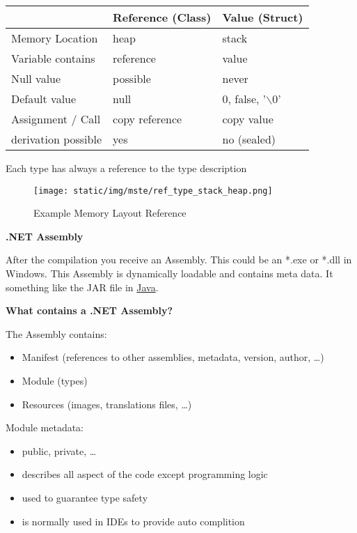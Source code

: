 \documentclass[11pt,twoside,landscape]{article}
\begin{document}
\begin{multicols}{3}
\begin{table}[htbp]
\label{tab:org7cf7613}
\centering
\begin{tabular}{lll}
 & Reference (Class) & Value (Struct)\\
\hline
Memory Location & heap & stack\\
Variable contains & reference & value\\
Null value & possible & never\\
Default value & null & 0, false, '$\backslash$0'\\
Assignment / Call & copy reference & copy value\\
derivation possible & yes & no (sealed)\\
\end{tabular}
\end{table}

Each type has always a reference to the type description 

\begin{figure}[htbp]
\centering
\texttt{[image: static/img/mste/ref\_type\_stack\_heap.png]}
\caption{\label{fig:orgfddb8f3}Example Memory Layout Reference}
\end{figure}

\textbf{.NET Assembly}

After the compilation you receive an Assembly.
This could be an *.exe or *.dll in Windows.
This Assembly is dynamically loadable and contains meta data.
It something like the JAR file in \href{../../../roam/20201116150053-java.org}{Java}.

\textbf{What contains a .NET Assembly?}

The Assembly contains:
\begin{itemize}
\item Manifest (references to other assemblies, metadata, version, author, \ldots{})
\item Module (types)
\item Resources  (images, translations files, \ldots{})
\end{itemize}


Module metadata:
\begin{itemize}
\item public, private, \ldots{}
\item describes all aspect of the code except programming logic
\item used to guarantee type safety
\item is normally used in IDEs to provide auto complition
\end{itemize}



\end{multicols}
\end{document}
